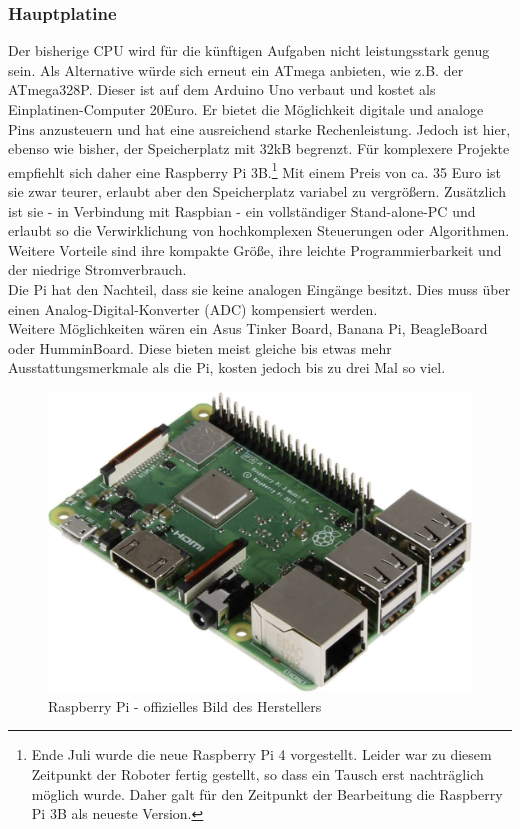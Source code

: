 \documentclass[twoside,11pt, a4paper]{report}
\begin{document}
	
	
	
	\subsubsection{Hauptplatine}
	Der bisherige CPU wird für die künftigen Aufgaben nicht leistungsstark genug sein. Als Alternative würde sich erneut ein ATmega anbieten, wie z.B. der ATmega328P. Dieser ist auf dem Arduino Uno verbaut und kostet als Einplatinen-Computer 20Euro. Er bietet die Möglichkeit digitale und analoge Pins anzusteuern und hat eine ausreichend starke Rechenleistung. Jedoch ist hier, ebenso wie bisher, der Speicherplatz mit 32kB begrenzt. Für komplexere Projekte empfiehlt sich daher eine Raspberry Pi 3B.\footnote{Ende Juli wurde die neue Raspberry Pi 4 vorgestellt. Leider war zu diesem Zeitpunkt der Roboter fertig gestellt, so dass ein Tausch erst nachträglich möglich wurde. Daher galt für den Zeitpunkt der Bearbeitung die Raspberry Pi 3B als neueste Version.} Mit einem Preis von ca. 35 Euro ist sie zwar teurer, erlaubt aber den Speicherplatz variabel zu vergrößern. Zusätzlich ist sie - in Verbindung mit Raspbian - ein vollständiger Stand-alone-PC und erlaubt so die Verwirklichung von hochkomplexen Steuerungen oder Algorithmen. Weitere Vorteile sind ihre kompakte Größe, ihre leichte Programmierbarkeit und der niedrige Stromverbrauch. \\
	Die Pi hat den Nachteil, dass sie keine analogen Eingänge besitzt. Dies muss über einen  Analog-Digital-Konverter (ADC) kompensiert werden. \\
	Weitere Möglichkeiten wären ein Asus Tinker Board, Banana Pi, BeagleBoard oder HumminBoard. Diese bieten meist gleiche bis etwas mehr Ausstattungsmerkmale als die Pi, kosten jedoch bis zu drei Mal so viel. 
	
	\begin{figure}[!htb]
		\centering
		\includegraphics[scale=0.2]{images/Pi.jpg}
		\caption{Raspberry Pi - offizielles Bild des Herstellers}
	\end{figure}
	
\end{document}
